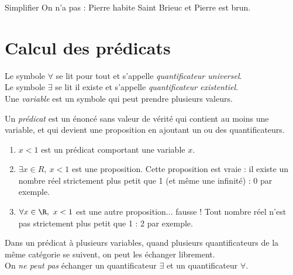 \documentclass[a4paper,12pt,french]{book}
\begin{document}
\begin{exercice}[]
	Simplifier \og On n'a pas : Pierre habite Saint Brieuc et Pierre est brun\fg{}.
\end{exercice}


\section{Calcul des prédicats}

\begin{definition}
	
	Le symbole $\forall$ se lit \og pour tout\fg{} et s'appelle \textit{quantificateur universel}.\\
	Le symbole $\exists$ se lit \og il existe\fg{} et s'appelle \textit{quantificateur existentiel}.\\
	
	Une \textit{variable} est un symbole qui peut prendre plusieurs valeurs.
	
	Un \textit{prédicat} est un énoncé sans valeur de vérité qui contient au moins une variable, et qui devient une proposition en ajoutant un ou des quantificateurs.
\end{definition}

\begin{exemple}[s]
	\begin{enumerate}[\textbullet]
		\item 	\og $x<1$\fg{} est un prédicat comportant une variable $x$.
		\item 	$\exists x\in R,\ x<1$ est une proposition. Cette proposition est vraie : il existe un nombre réel strictement plus petit que 1 (et même une infinité) : 0 par exemple.
		\item 	$\forall x\in\R,\ x<1$ est une autre proposition... fausse ! Tout nombre réel n'est pas strictement plus petit que 1 : 2 par exemple.
	\end{enumerate}
\end{exemple}

\begin{propriete}
	Dans un prédicat à plusieurs variables, quand plusieurs quantificateurs de la même catégorie se suivent, on peut les échanger librement.\\
	On \textit{ne peut pas} échanger un quantificateur $\exists$ et un quantificateur $\forall$.
\end{propriete}
\end{document}
